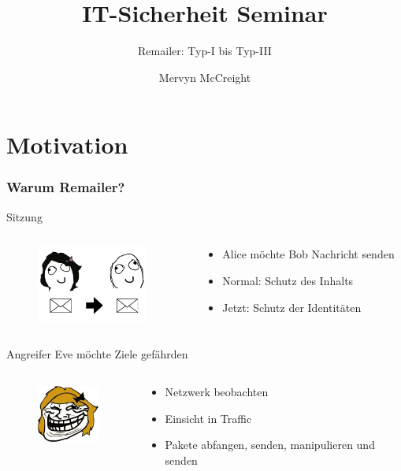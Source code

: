 \documentclass{beamer}
\title[Seminar]{IT-Sicherheit Seminar}
\subtitle[Remailer]{Remailer: Typ-I bis Typ-III}
\author[M. McCreight]{Mervyn McCreight}
\institute[FH-Wedel]{FH-Wedel}
\begin{document}
\frame{\titlepage}

\section{Motivation}
\begin{frame}
	\frametitle{Warum Remailer?}
	\begin{exampleblock}{Sitzung}
	\begin{columns}[T]
		\begin{column}{2.5cm}
			\centering
				\begin{figure}
					\includegraphics[height=2.5cm]{bilder/modell.jpg}
				\end{figure}
		\end{column}
		\begin{column}{7cm}	
			\centering
			\begin{itemize}	
				\item Alice möchte Bob Nachricht senden
				\item Normal: Schutz des Inhalts
				\item Jetzt: Schutz der Identitäten
			\end{itemize}
		\end{column}
	\end{columns}
	\end{exampleblock}

	\begin{alertblock}{Angreifer Eve möchte Ziele gefährden}
		\begin{columns}[T]
		\begin{column}{2.5cm}
				\begin{figure}
					\includegraphics[height=2cm]{bilder/eve.jpg}
				\end{figure}
		\end{column}
		\begin{column}{8cm}
			\begin{itemize}	
				\item Netzwerk beobachten
				\item Einsicht in Traffic
				\item Pakete abfangen, senden, manipulieren und senden
			\end{itemize}
		\end{column}
	\end{columns}
	\end{alertblock}

\end{frame}
\end{document}
